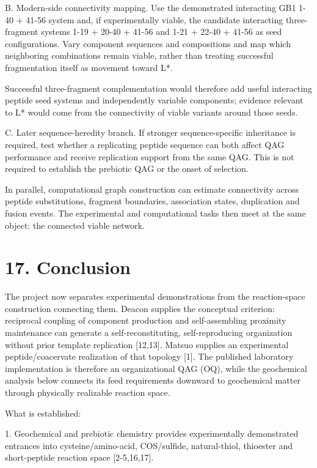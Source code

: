 \documentclass[11pt]{article}
\begin{document}
B. Modern-side connectivity mapping. Use the demonstrated interacting GB1 1-40 + 41-56 system and, if experimentally viable, the candidate interacting three-fragment systems 1-19 + 20-40 + 41-56 and 1-21 + 22-40 + 41-56 as seed configurations. Vary component sequences and compositions and map which neighboring combinations remain viable, rather than treating successful fragmentation itself as movement toward L*.

Successful three-fragment complementation would therefore add useful interacting peptide seed systems and independently variable components; evidence relevant to L* would come from the connectivity of viable variants around those seeds.

C. Later sequence-heredity branch. If stronger sequence-specific inheritance is required, test whether a replicating peptide sequence can both affect QAG performance and receive replication support from the same QAG. This is not required to establish the prebiotic QAG or the onset of selection.

In parallel, computational graph construction can estimate connectivity across peptide substitutions, fragment boundaries, association states, duplication and fusion events. The experimental and computational tasks then meet at the same object: the connected viable network.

\hypertarget{conclusion}{%
\section*{17. Conclusion}\label{conclusion}}

The project now separates experimental demonstrations from the reaction-space construction connecting them. Deacon supplies the conceptual criterion: reciprocal coupling of component production and self-assembling proximity maintenance can generate a self-reconstituting, self-reproducing organization without prior template replication {[}12,13{]}. Matsuo supplies an experimental peptide/coacervate realization of that topology {[}1{]}. The published laboratory implementation is therefore an organizational QAG (OQ), while the geochemical analysis below connects its feed requirements downward to geochemical matter through physically realizable reaction space.

What is established:

1. Geochemical and prebiotic chemistry provides experimentally demonstrated entrances into cysteine/amino-acid, COS/sulfide, natural-thiol, thioester and short-peptide reaction space {[}2-5,16,17{]}.
\end{document}
